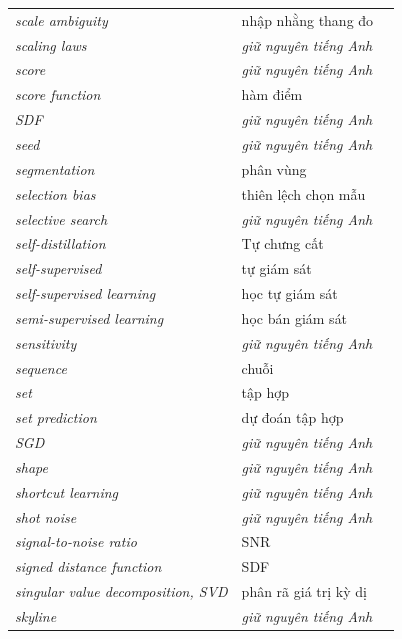 \documentclass[deep_learning.tex]{subfiles}
\begin{document}
\begin{longtable}{@{}L{5.2cm}L{5.9cm}L{2.6cm}@{}}
\emph{scale ambiguity} & nhập nhằng thang đo & \\
\emph{scaling laws} & \emph{\color{tiercol}giữ nguyên tiếng Anh} & \\
\emph{score} & \emph{\color{tiercol}giữ nguyên tiếng Anh} & \\
\emph{score function} & hàm điểm & \\
\emph{SDF} & \emph{\color{tiercol}giữ nguyên tiếng Anh} & \\
\emph{seed} & \emph{\color{tiercol}giữ nguyên tiếng Anh} & \\
\emph{segmentation} & phân vùng & \\
\emph{selection bias} & thiên lệch chọn mẫu & \\
\emph{selective search} & \emph{\color{tiercol}giữ nguyên tiếng Anh} & \\
\emph{self-distillation} & Tự chưng cất & \\
\emph{self-supervised} & tự giám sát & \\
\emph{self-supervised learning} & học tự giám sát & \\
\emph{semi-supervised learning} & học bán giám sát & \\
\emph{sensitivity} & \emph{\color{tiercol}giữ nguyên tiếng Anh} & \\
\emph{sequence} & chuỗi & \\
\emph{set} & tập hợp & \\
\emph{set prediction} & dự đoán tập hợp & \\
\emph{SGD} & \emph{\color{tiercol}giữ nguyên tiếng Anh} & \\
\emph{shape} & \emph{\color{tiercol}giữ nguyên tiếng Anh} & \\
\emph{shortcut learning} & \emph{\color{tiercol}giữ nguyên tiếng Anh} & \\
\emph{shot noise} & \emph{\color{tiercol}giữ nguyên tiếng Anh} & \\
\emph{signal-to-noise ratio} & SNR & \\
\emph{signed distance function} & SDF & \\
\emph{singular value decomposition, SVD} & phân rã giá trị kỳ dị & \\
\emph{skyline} & \emph{\color{tiercol}giữ nguyên tiếng Anh} & \\

\end{longtable}
\end{document}
